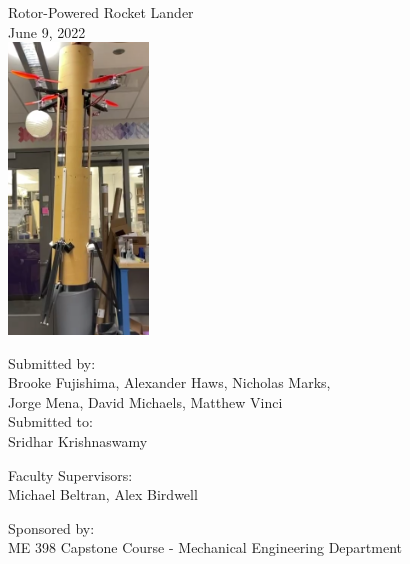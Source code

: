 \documentclass[11pt, oneside, letter]{memoir}
\begin{document}
\frontmatter


\begin{titlingpage}
\centering
\HUGE\color{nu-purple}\sffamily Rotor-Powered Rocket Lander \\
\vspace{1cm}
\Large\color{black}\sffamily June 9, 2022\\
\vspace{1cm}
\includegraphics[width=0.28\textwidth]{src/figs/matt_holding_rocket.png}

\vspace{0.5cm}

\Large\color{black}\sffamily Submitted by:\\
\Large\color{gray}\sffamily Brooke Fujishima, Alexander Haws, Nicholas Marks,\\
Jorge Mena, David Michaels, Matthew Vinci\\

\vspace{1cm}
\Large\color{black}\sffamily Submitted to:\\
\Large\color{gray}\sffamily Sridhar Krishnaswamy \\
\vspace{1cm}

\Large\color{black}\sffamily Faculty Supervisors: \\
\Large\color{gray}\sffamily Michael Beltran, Alex Birdwell \\
\vspace{1cm}

\Large\color{black}\sffamily Sponsored by: \\
\Large\color{gray}\sffamily ME 398 Capstone Course - Mechanical Engineering Department\\
\vspace{1cm}
\end{titlingpage}
\end{document}
